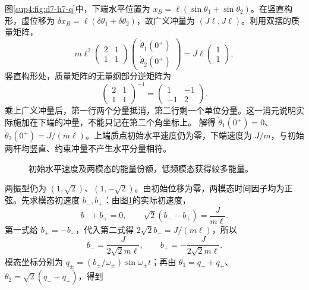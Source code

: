 \begin{solution}
图\ref{sup4:fig:d7-h7-q}中，下端水平位置为 $x_B=\ell(\sin\theta_1+\sin\theta_2)$。在竖直构形，虚位移为 $\delta x_B=\ell(\delta\theta_1+\delta\theta_2)$，故广义冲量为 $(J\ell,J\ell)$。利用双摆的质量矩阵，
\[
m\ell^2\begin{pmatrix}2&1\\1&1\end{pmatrix}
\begin{pmatrix}\dot\theta_1(0^+)\\\dot\theta_2(0^+)\end{pmatrix}
=J\ell\begin{pmatrix}1\\1\end{pmatrix},
\]
竖直构形处，质量矩阵的无量纲部分逆矩阵为
\[
\begin{pmatrix}2&1\\1&1\end{pmatrix}^{-1}
=\begin{pmatrix}1&-1\\-1&2\end{pmatrix}.
\]
乘上广义冲量后，第一行两个分量抵消，第二行剩一个单位分量。这一消元说明实际施加在下端的冲量，不能只记在第二个角坐标上。
解得 $\dot\theta_1(0^+)=0$、$\dot\theta_2(0^+)=J/(m\ell)$。上端质点初始水平速度仍为零，下端速度为 $J/m$，与初始两杆均竖直、约束冲量不产生水平分量相符。
\begin{figure}[H]\centering
{}
\caption{初始水平速度及两模态的能量份额，低频模态获得较多能量。}\label{sup4:fig:d7-h7-s}
\end{figure}
两振型仍为 $(1,\sqrt2)$、$(1,-\sqrt2)$。由初始位移为零，两模态时间因子均为正弦。先求模态初速度 $b_-,b_+$：由图\ref{sup4:fig:d7-h7-s}的实际初速度，
\[
b_-+b_+=0,\qquad
\sqrt2(b_--b_+)=\frac{J}{m\ell}.
\]
第一式给 $b_+=-b_-$，代入第二式得 $2\sqrt2b_-=J/(m\ell)$，所以
\[
b_-=\frac{J}{2\sqrt2m\ell},\qquad b_+=-\frac{J}{2\sqrt2m\ell}.
\]
模态坐标分别为 $q_\pm=(b_\pm/\omega_\pm)\sin\omega_\pm t$；再由 $\theta_1=q_-+q_+$、$\theta_2=\sqrt2(q_--q_+)$，得到

\end{solution}
